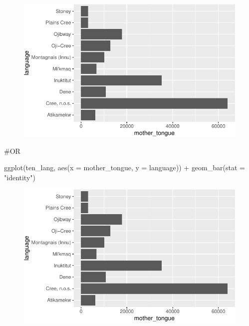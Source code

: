 \documentclass[
  letterpaper,
  DIV=11,
  numbers=noendperiod]{scrartcl}
\newenvironment{Shaded}{\begin{snugshade}}{\end{snugshade}}
\newcommand{\AttributeTok}[1]{\textcolor[rgb]{0.40,0.45,0.13}{#1}}
\newcommand{\CommentTok}[1]{\textcolor[rgb]{0.37,0.37,0.37}{#1}}
\newcommand{\FunctionTok}[1]{\textcolor[rgb]{0.28,0.35,0.67}{#1}}
\newcommand{\NormalTok}[1]{\textcolor[rgb]{0.00,0.23,0.31}{#1}}
\newcommand{\SpecialCharTok}[1]{\textcolor[rgb]{0.37,0.37,0.37}{#1}}
\newcommand{\StringTok}[1]{\textcolor[rgb]{0.13,0.47,0.30}{#1}}
\begin{document}
\begin{figure}[H]

{\centering \includegraphics{118_D_ggplot_files/figure-pdf/unnamed-chunk-5-1.pdf}

}

\end{figure}

\begin{Shaded}
\begin{Highlighting}[]
\CommentTok{\#OR}

\FunctionTok{ggplot}\NormalTok{(ten\_lang, }\FunctionTok{aes}\NormalTok{(}\AttributeTok{x =}\NormalTok{ mother\_tongue, }\AttributeTok{y =}\NormalTok{ language)) }\SpecialCharTok{+}
  \FunctionTok{geom\_bar}\NormalTok{(}\AttributeTok{stat =} \StringTok{"identity"}\NormalTok{) }
\end{Highlighting}
\end{Shaded}

\begin{figure}[H]

{\centering \includegraphics{118_D_ggplot_files/figure-pdf/unnamed-chunk-5-2.pdf}

}

\end{figure}
\end{document}
